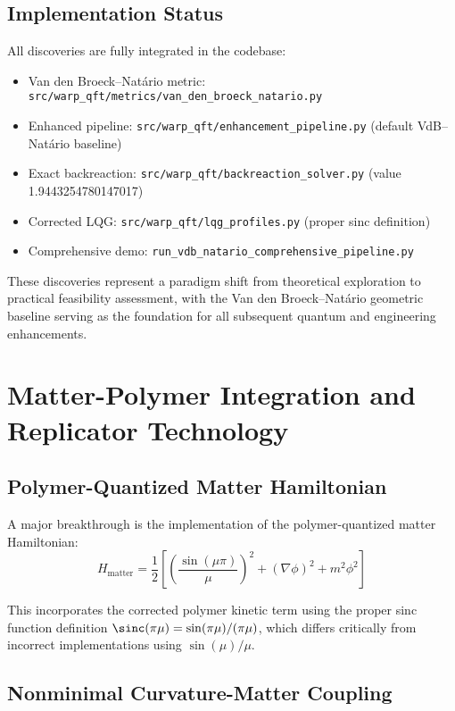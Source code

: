 \documentclass[11pt]{article}
\begin{document}
\subsection{Implementation Status}
All discoveries are fully integrated in the codebase:
\begin{itemize}
\item Van den Broeck–Natário metric: \texttt{src/warp\_qft/metrics/van\_den\_broeck\_natario.py}
\item Enhanced pipeline: \texttt{src/warp\_qft/enhancement\_pipeline.py} (default VdB–Natário baseline)
\item Exact backreaction: \texttt{src/warp\_qft/backreaction\_solver.py} (value 1.9443254780147017)
\item Corrected LQG: \texttt{src/warp\_qft/lqg\_profiles.py} (proper sinc definition)
\item Comprehensive demo: \texttt{run\_vdb\_natario\_comprehensive\_pipeline.py}
\end{itemize}

These discoveries represent a paradigm shift from theoretical exploration to practical feasibility assessment, with the Van den Broeck–Natário geometric baseline serving as the foundation for all subsequent quantum and engineering enhancements.

\section{Matter-Polymer Integration and Replicator Technology}

\subsection{Polymer-Quantized Matter Hamiltonian}

A major breakthrough is the implementation of the polymer-quantized matter Hamiltonian:
\begin{equation}
H_{\text{matter}} = \frac{1}{2}\left[\left(\frac{\sin(\mu\pi)}{\mu}\right)^2 + (\nabla\phi)^2 + m^2\phi^2\right]
\end{equation}

This incorporates the corrected polymer kinetic term using the proper sinc function definition $\sinc(\pi\mu) = \sin(\pi\mu)/(\pi\mu)$, which differs critically from incorrect implementations using $\sin(\mu)/\mu$.

\subsection{Nonminimal Curvature-Matter Coupling}
\end{document}
